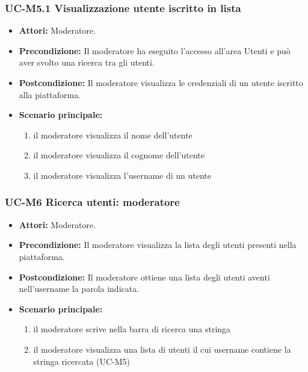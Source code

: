 \subsubsection{UC-M5.1 Visualizzazione utente iscritto in lista}
	\begin{itemize}
		\item \textbf{Attori:} Moderatore.
		\item \textbf{Precondizione:} Il moderatore ha eseguito l'accesso all'area Utenti e può aver svolto una ricerca tra gli utenti.
		\item \textbf{Postcondizione:} Il moderatore visualizza le credenziali di un utente iscritto alla piattaforma.
		\item \textbf{Scenario principale:}
			\begin{enumerate}
				\item il moderatore visualizza il nome dell'utente
				\item il moderatore visualizza il cognome dell'utente
				\item il moderatore visualizza l'username di un utente
			\end{enumerate}
	\end{itemize}
		
\subsubsection{UC-M6 Ricerca utenti: moderatore}
	\begin{itemize}
		\item \textbf{Attori:} Moderatore.
		\item \textbf{Precondizione:} Il moderatore visualizza la lista degli utenti presenti nella piattaforma.
		\item \textbf{Postcondizione:} Il moderatore ottiene una lista degli utenti aventi nell'username la parola indicata.
		\item \textbf{Scenario principale:}
			\begin{enumerate}
				\item il moderatore scrive nella barra di ricerca una stringa
				\item il moderatore visualizza una lista di utenti il cui username contiene la stringa ricercata (UC-M5)
			\end{enumerate}
	\end{itemize}

